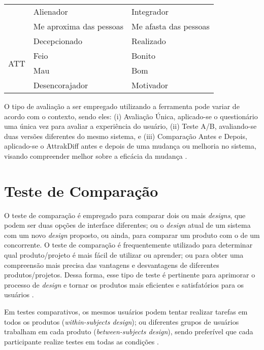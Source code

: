 \begin{table}[h]
\begin{tabular}{|c|ll|}
                         & \multicolumn{1}{l|}{Alienador}               & Integrador            \\ \cline{2-3} 
                         & \multicolumn{1}{l|}{Me aproxima das pessoas} & Me afasta das pessoas \\ \hline
    \multirow{4}{*}{ATT} & \multicolumn{1}{l|}{Decepcionado}            & Realizado             \\ \cline{2-3} 
                         & \multicolumn{1}{l|}{Feio}                    & Bonito                \\ \cline{2-3} 
                         & \multicolumn{1}{l|}{Mau}                     & Bom                   \\ \cline{2-3} 
                         & \multicolumn{1}{l|}{Desencorajador}          & Motivador             \\ \hline
    \end{tabular}
\end{table}

O tipo de avaliação a ser empregado utilizando a ferramenta pode variar de acordo com o contexto, sendo eles: (i) Avaliação Única, aplicado-se o questionário uma única vez para avaliar 
a experiência do usuário, (ii) Teste A/B, avaliando-se duas versões diferentes do mesmo sistema, e (iii) Comparação Antes e Depois, aplicado-se o AttrakDiff antes e 
depois de uma mudança ou melhoria no sistema,  visando compreender melhor sobre a eficácia da mudança \cite{nzongo2018}.

\section{Teste de Comparação}
\label{sec:Teste de Comparação}

O teste de comparação é empregado para comparar dois ou mais \textit{designs}, que podem ser duas opções de interface diferentes; ou o \textit{design} atual de um sistema com um novo 
\textit{design} proposto, ou ainda, para comparar um produto com o de um concorrente. O teste de comparação é frequentemente utilizado para determinar qual produto/projeto é mais fácil 
de utilizar ou aprender; ou para obter uma compreensão mais precisa das vantagens e desvantagens de diferentes produtos/projetos. Dessa forma, esse tipo de teste é pertinente para aprimorar 
o processo de \textit{design} e tornar os produtos mais eficientes e satisfatórios para os usuários \cite{rubin2011}.

Em testes comparativos, os mesmos usuários podem tentar realizar tarefas em todos os produtos (\textit{within-subjects design}); ou diferentes grupos de usuários trabalham em cada 
produto (\textit{between-subjects design}), sendo preferível que cada participante realize testes em todas as condições \cite{lewis2016}. 

